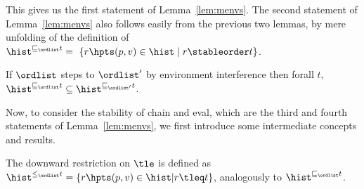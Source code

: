
This gives us the first statement of Lemma~\ref{lem:menvs}. The second
statement of Lemma~\ref{lem:menvs} also follows easily from the
previous two lemmas, by mere unfolding of the definition of
$\chainjleq{t}{\ordlist} =\ \{ r \hpts (p,v) \in \hist \mid r
\stableorder t \}$.

\begin{lemma}\label{lem:ideal-stable}
If $\ordlist$ steps to $\ordlist'$ by environment interference then
forall $t$, $\chainjleq{t}{\ordlist} \subseteq
\chainjleq{t}{\ordlist'}$.
\end{lemma}



Now, to consider the stability of {\sf chain} and {\sf eval}, which
are the third and fourth statements of Lemma~\ref{lem:menvs}, we first
introduce some intermediate concepts and results.  



\begin{definition}\label{def:chaintleq}%
The downward restriction on $\tle$ is defined as $
\chaintleq{t}{\ordlist} = \{ r \hpts (p,v) \in \hist | r \tleq t \}$,
analogously to $\chainjleq{t}{\ordlist}$.
\end{definition}

